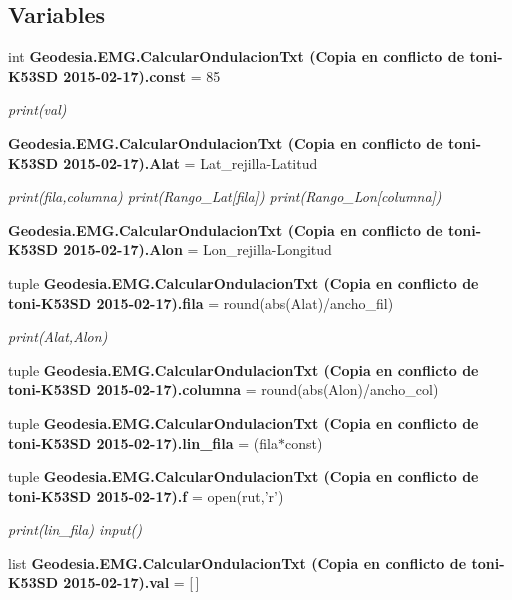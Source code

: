 \subsection*{Variables}
\begin{DoxyCompactItemize}
\item 
int {\bf Geodesia.\-E\-M\-G.\-Calcular\-Ondulacion\-Txt (\-Copia en conflicto de toni-\/\-K53\-S\-D 2015-\/02-\/17).\-const} = 85
\begin{DoxyCompactList}\small\item\em print(val) \end{DoxyCompactList}\item 
{\bf Geodesia.\-E\-M\-G.\-Calcular\-Ondulacion\-Txt (\-Copia en conflicto de toni-\/\-K53\-S\-D 2015-\/02-\/17).\-Alat} = Lat\-\_\-rejilla-\/Latitud
\begin{DoxyCompactList}\small\item\em print(fila,columna) print(\-Rango\-\_\-\-Lat[fila]) print(\-Rango\-\_\-\-Lon[columna]) \end{DoxyCompactList}\item 
{\bf Geodesia.\-E\-M\-G.\-Calcular\-Ondulacion\-Txt (\-Copia en conflicto de toni-\/\-K53\-S\-D 2015-\/02-\/17).\-Alon} = Lon\-\_\-rejilla-\/Longitud
\item 
tuple {\bf Geodesia.\-E\-M\-G.\-Calcular\-Ondulacion\-Txt (\-Copia en conflicto de toni-\/\-K53\-S\-D 2015-\/02-\/17).\-fila} = round(abs(Alat)/ancho\-\_\-fil)
\begin{DoxyCompactList}\small\item\em print(\-Alat,\-Alon) \end{DoxyCompactList}\item 
tuple {\bf Geodesia.\-E\-M\-G.\-Calcular\-Ondulacion\-Txt (\-Copia en conflicto de toni-\/\-K53\-S\-D 2015-\/02-\/17).\-columna} = round(abs(Alon)/ancho\-\_\-col)
\item 
tuple {\bf Geodesia.\-E\-M\-G.\-Calcular\-Ondulacion\-Txt (\-Copia en conflicto de toni-\/\-K53\-S\-D 2015-\/02-\/17).\-lin\-\_\-fila} = (fila$\ast$const)
\item 
tuple {\bf Geodesia.\-E\-M\-G.\-Calcular\-Ondulacion\-Txt (\-Copia en conflicto de toni-\/\-K53\-S\-D 2015-\/02-\/17).\-f} = open(rut,'r')
\begin{DoxyCompactList}\small\item\em print(lin\-\_\-fila) input() \end{DoxyCompactList}\item 
list {\bf Geodesia.\-E\-M\-G.\-Calcular\-Ondulacion\-Txt (\-Copia en conflicto de toni-\/\-K53\-S\-D 2015-\/02-\/17).\-val} = [$\,$]

\end{DoxyCompactItemize}
